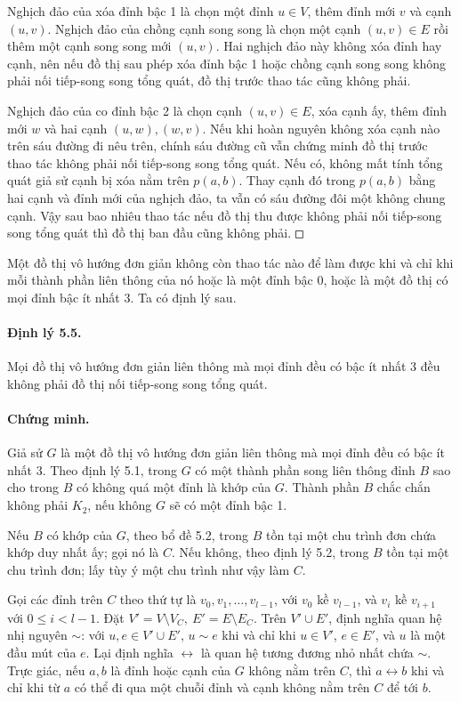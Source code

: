\documentclass[11pt]{article}
\newcommand{\square}{\mathord{\vcenter{\hrule height .5pt
  \hbox{\vrule width .5pt height 5pt\kern5pt\vrule width .5pt}
  \hrule height .5pt}}}
\begin{document}
Nghịch đảo của xóa đỉnh bậc 1 là chọn một đỉnh \(u\in V\), thêm đỉnh mới
\(v\) và cạnh \((u,v)\). Nghịch đảo của chồng cạnh song song là chọn một cạnh
\((u,v)\in E\) rồi thêm một cạnh song song mới \((u,v)\). Hai nghịch đảo này
không xóa đỉnh hay cạnh, nên nếu đồ thị sau phép xóa đỉnh bậc 1 hoặc chồng
cạnh song song không phải nối tiếp-song song tổng quát, đồ thị trước thao tác
cũng không phải.

Nghịch đảo của co đỉnh bậc 2 là chọn cạnh \((u,v)\in E\), xóa cạnh ấy, thêm
đỉnh mới \(w\) và hai cạnh \((u,w),(w,v)\). Nếu khi hoàn nguyên không xóa cạnh
nào trên sáu đường đi nêu trên, chính sáu đường cũ vẫn chứng minh đồ thị trước
thao tác không phải nối tiếp-song song tổng quát. Nếu có, không mất tính tổng
quát giả sử cạnh bị xóa nằm trên \(p(a,b)\). Thay cạnh đó trong \(p(a,b)\)
bằng hai cạnh và đỉnh mới của nghịch đảo, ta vẫn có sáu đường đôi một không
chung cạnh. Vậy sau bao nhiêu thao tác nếu đồ thị thu được không phải nối
tiếp-song song tổng quát thì đồ thị ban đầu cũng không phải. \(\square\)

Một đồ thị vô hướng đơn giản không còn thao tác nào để làm được khi và chỉ khi
mỗi thành phần liên thông của nó hoặc là một đỉnh bậc 0, hoặc là một đồ thị
có mọi đỉnh bậc ít nhất 3. Ta có định lý sau.

\paragraph{Định lý 5.5.}
Mọi đồ thị vô hướng đơn giản liên thông mà mọi đỉnh đều có bậc ít nhất 3 đều
không phải đồ thị nối tiếp-song song tổng quát.

\paragraph{Chứng minh.}
Giả sử \(G\) là một đồ thị vô hướng đơn giản liên thông mà mọi đỉnh đều có bậc
ít nhất 3. Theo định lý 5.1, trong \(G\) có một thành phần song liên thông
đỉnh \(B\) sao cho trong \(B\) có không quá một đỉnh là khớp của \(G\).
Thành phần \(B\) chắc chắn không phải \(K_2\), nếu không \(G\) sẽ có một đỉnh
bậc 1.

Nếu \(B\) có khớp của \(G\), theo bổ đề 5.2, trong \(B\) tồn tại một chu trình
đơn chứa khớp duy nhất ấy; gọi nó là \(C\). Nếu không, theo định lý 5.2, trong
\(B\) tồn tại một chu trình đơn; lấy tùy ý một chu trình như vậy làm \(C\).

Gọi các đỉnh trên \(C\) theo thứ tự là \(v_0,v_1,\ldots,v_{l-1}\), với
\(v_0\) kề \(v_{l-1}\), và \(v_i\) kề \(v_{i+1}\) với \(0\le i<l-1\).
Đặt \(V'=V\setminus V_C,\ E'=E\setminus E_C\). Trên \(V'\cup E'\), định nghĩa
quan hệ nhị nguyên \(\sim\): với \(u,e\in V'\cup E'\), \(u\sim e\) khi và chỉ
khi \(u\in V'\), \(e\in E'\), và \(u\) là một đầu mút của \(e\). Lại định
nghĩa \(\leftrightarrow\) là quan hệ tương đương nhỏ nhất chứa \(\sim\). Trực
giác, nếu \(a,b\) là đỉnh hoặc cạnh của \(G\) không nằm trên \(C\), thì
\(a\leftrightarrow b\) khi và chỉ khi từ \(a\) có thể đi qua một chuỗi đỉnh và
cạnh không nằm trên \(C\) để tới \(b\).
\end{document}

